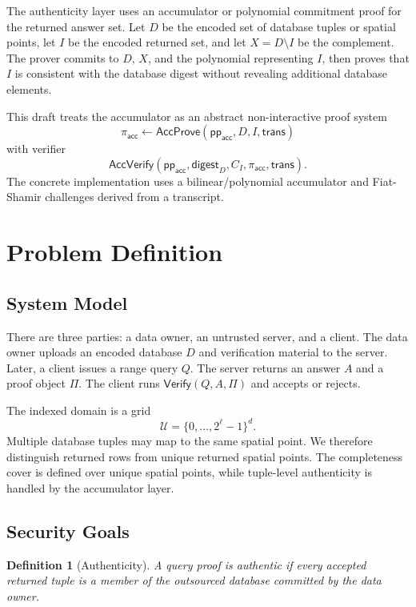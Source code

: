 \documentclass[11pt]{article}
\newtheorem{definition}{Definition}
\newcommand{\Verify}{\mathsf{Verify}}
\newcommand{\pp}{\mathsf{pp}}
\newcommand{\trans}{\mathsf{trans}}
\begin{document}
The authenticity layer uses an accumulator or polynomial commitment proof for the returned answer set. Let $D$ be the encoded set of database tuples or spatial points, let $I$ be the encoded returned set, and let $X=D\setminus I$ be the complement. The prover commits to $D$, $X$, and the polynomial representing $I$, then proves that $I$ is consistent with the database digest without revealing additional database elements.

This draft treats the accumulator as an abstract non-interactive proof system
\[
  \pi_{\mathsf{acc}} \leftarrow
  \mathsf{AccProve}(\pp_{\mathsf{acc}},D,I,\trans)
\]
with verifier
\[
  \mathsf{AccVerify}(\pp_{\mathsf{acc}},\mathsf{digest}_D,C_I,\pi_{\mathsf{acc}},\trans).
\]
The concrete implementation uses a bilinear/polynomial accumulator and Fiat-Shamir challenges derived from a transcript.

\section{Problem Definition}

\subsection{System Model}

There are three parties: a data owner, an untrusted server, and a client. The data owner uploads an encoded database $D$ and verification material to the server. Later, a client issues a range query $Q$. The server returns an answer $A$ and a proof object $\Pi$. The client runs $\Verify(Q,A,\Pi)$ and accepts or rejects.

The indexed domain is a grid
\[
  \mathcal{U} = \{0,\ldots,2^\ell-1\}^d.
\]
Multiple database tuples may map to the same spatial point. We therefore distinguish returned rows from unique returned spatial points. The completeness cover is defined over unique spatial points, while tuple-level authenticity is handled by the accumulator layer.

\subsection{Security Goals}

\begin{definition}[Authenticity]
A query proof is authentic if every accepted returned tuple is a member of the outsourced database committed by the data owner.
\end{definition}
\end{document}
